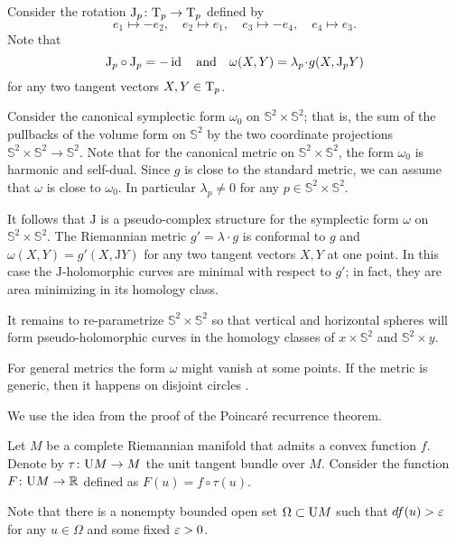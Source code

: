 Consider the rotation $\mathrm{J}_p\colon\mathrm{T}_p\to\mathrm{T}_p$ defined by 
\[ 
e_1\mapsto -e_2,
\quad 
e_2\mapsto e_1,
\quad 
e_3\mapsto -e_4,
\quad 
e_4\mapsto e_3.\]
Note that
\[\mathrm{J}_p\circ\mathrm{J}_p =-\id
\quad\text{and}\quad
\omega(X,Y)=\lambda_p\cdot g(X,\mathrm{J}_pY)\] 
for any two tangent vectors $X,Y\in \mathrm{T}_p$.

Consider the canonical symplectic form $\omega_0$ on $\mathbb{S}^2\times\mathbb{S}^2$;
that is, the sum of the pullbacks of the volume form on $\mathbb{S}^2$  
by the two coordinate projections $\mathbb{S}^2\times\mathbb{S}^2\to \mathbb{S}^2$.
Note that for the canonical metric on $\mathbb{S}^2\times\mathbb{S}^2$,
the form $\omega_0$ is harmonic and self-dual. 
Since $g$ is close to the standard metric,
we can assume that $\omega$ is close to $\omega_0$.
In particular $\lambda_p\ne0$ for any $p\in \mathbb{S}^2\times\mathbb{S}^2$.

It follows that $\mathrm{J}$ is a pseudo-complex structure for the symplectic form $\omega$ on $\mathbb{S}^2\times\mathbb{S}^2$.
The Riemannian metric $g'=\lambda\cdot g$ is conformal to $g$ and $\omega(X,Y)=g'(X,\mathrm{J} Y)$ 
for any two tangent vectors $X,Y$ at one point.
In this case the $\mathrm{J}$-holomorphic curves are minimal with respect to $g'$;
in fact, they are area minimizing in its homology class. 

It remains to re-parametrize $\mathbb{S}^2\times \mathbb{S}^2$
so that vertical and horizontal spheres will form pseudo-holomorphic curves in the homology classes of $x\times \mathbb{S}^2$ and $\mathbb{S}^2\times y$.
\qeds
 
 
For general metrics the form $\omega$ might vanish at some points.
If the metric is generic, then it happens on disjoint circles \cite[see][]{honda}.







We use the idea from the proof of the Poincar\'e recurrence theorem.

\medskip

Let $M$ be a complete Riemannian manifold that admits a convex function $f$.
Denote by $\tau\colon\mathrm{U} M\to M$ the unit tangent bundle over $M$. 
Consider the function $F\colon\mathrm{U} M\to \mathbb{R}$ defined as $F(u)=f\circ\tau(u)$.

Note that 
there is a nonempty bounded open set $\Omega\subset \mathrm{U} M$
such that $df(u)>\varepsilon$ for any $u\in \Omega$ and some fixed $\varepsilon>0$.

